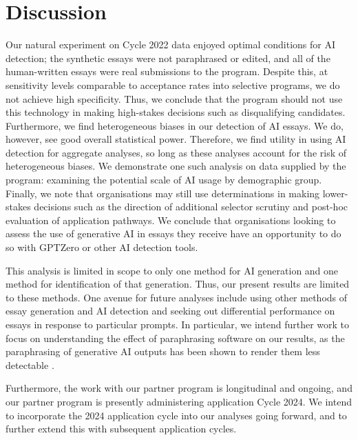 \section{Discussion}\label{sec:conc}
Our natural experiment on Cycle 2022 data enjoyed optimal conditions for AI detection; the synthetic essays were not paraphrased or edited, and all of the human-written essays were real submissions to the program. Despite this, at sensitivity levels comparable to acceptance rates into selective programs, we do not achieve high specificity. Thus, we conclude that the program should not use this technology in making high-stakes decisions such as disqualifying candidates. Furthermore, we find heterogeneous biases in our detection of AI essays. We do, however, see good overall statistical power. Therefore, we find utility in using AI detection for aggregate analyses, so long as these analyses account for the risk of heterogeneous biases. We demonstrate one such analysis on data supplied by the program: examining the potential scale of AI usage by demographic group. Finally, we note that organisations may still use determinations in making lower-stakes decisions such as the direction of additional selector scrutiny and post-hoc evaluation of application pathways. We conclude that organisations looking to assess the use of generative AI in essays they receive have an opportunity to do so with GPTZero or other AI detection tools.

This analysis is limited in scope to only one method for AI generation and one method for identification of that generation. Thus, our present results are limited to these methods. One avenue for future analyses include using other methods of essay generation and AI detection and seeking out differential performance on essays in response to particular prompts. In particular, we intend further work to focus on understanding the effect of paraphrasing software on our results, as the paraphrasing of generative AI outputs has been shown to render them less detectable \cite{mitchell_detectgpt_2023,kalpesh_krishna_paraphrasing_2023}.

Furthermore, the work with our partner program is longitudinal and ongoing, and our partner program is presently administering application Cycle 2024. We intend to incorporate the 2024 application cycle into our analyses going forward, and to further extend this with subsequent application cycles.